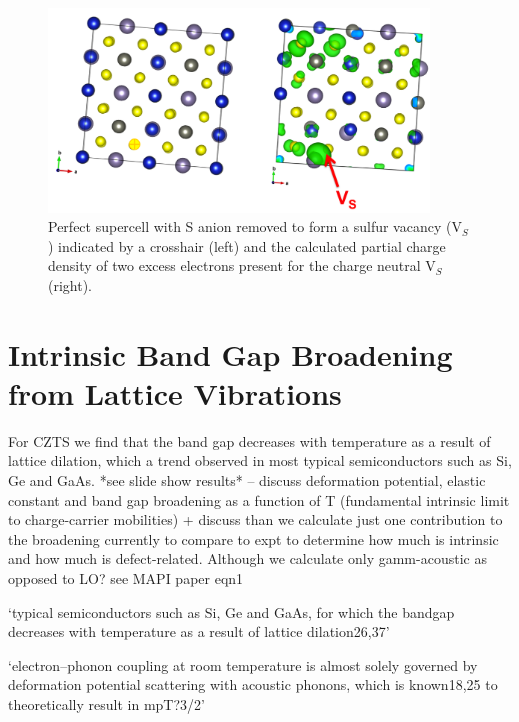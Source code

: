 \begin{figure}[h!]
  \centering
    \includegraphics[width=0.9\textwidth]{figures/V_S-neutral-PARCHG.png}
    \caption{Perfect {\CZTS } supercell with S anion removed to form a sulfur vacancy (V$_S$) indicated by a crosshair (left) and the calculated partial charge density of two excess electrons present for the charge neutral V$_S$ (right).}
  \label{V_S-neutral-PARCHG}
\end{figure}

\section{Intrinsic Band Gap Broadening from Lattice Vibrations}
For CZTS we find that the band gap decreases with temperature as a result of lattice dilation, which a trend observed in most typical semiconductors such as Si, Ge and GaAs. *see slide show results* -- discuss deformation potential, elastic constant and band gap broadening as a function of T (fundamental intrinsic limit to charge-carrier mobilities) + discuss than we calculate just one contribution to the broadening currently to compare to expt to determine how much is intrinsic and how much is defect-related. Although we calculate only gamm-acoustic as opposed to LO? see MAPI paper eqn1

`typical semiconductors such as Si, Ge and GaAs, for which the bandgap decreases with temperature as a result of lattice dilation26,37' \cite{MAPI_Eg_broadening} 

`electron–phonon coupling at room temperature is almost solely governed by deformation potential scattering with acoustic phonons, which is known18,25 to theoretically result in mpT?3/2' \cite{MAPI_Eg_broadening}

